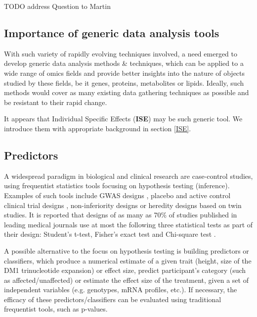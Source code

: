 TODO address Question to Martin

\subsection{Importance of generic data analysis tools}

With such variety of rapidly evolving techniques involved, a need emerged to develop generic data analysis methods \& techniques, which can be applied to a wide range of omics fields and provide better insights into the nature of objects studied by these fields, be it genes, proteins, metabolites or lipids. Ideally, such methods would cover as many existing data gathering techniques as possible and be resistant to their rapid change.

It appears that Individual Specific Effects (\textbf{ISE}) may be such generic tool. We introduce them with appropriate background in section 
\ref{ISE}.

\subsection{Predictors}

A widespread paradigm in biological and clinical research are case-control studies, using frequentist statistics tools focusing on hypothesis testing (inference). Examples of such tools include GWAS designs \parencite{Bush2012}, placebo and active control clinical trial designs \parencite{Brody2016}, non-inferiority designs \parencite{DAgostino2002} or heredity designs based on twin studies. It is reported that designs of as many as 70\%  of studies published in leading medical journals use at most the following three statistical tests as part of their design: Student's t-test, Fisher's exact test and Chi-square test \parencite{Prel2010}.

A possible alternative to the focus on hypothesis testing is building predictors or classifiers, which produce a numerical estimate of a given trait (height, size of the DM1 trinucleotide expansion) or effect size, predict participant's category (such as affected/unaffected) or estimate the effect size of the treatment, given a set of independent variables (e.g. genotypes, mRNA profiles, etc.). If necessary, the efficacy of these predictors/classifiers can be evaluated using traditional frequentist tools, such as p-values.

